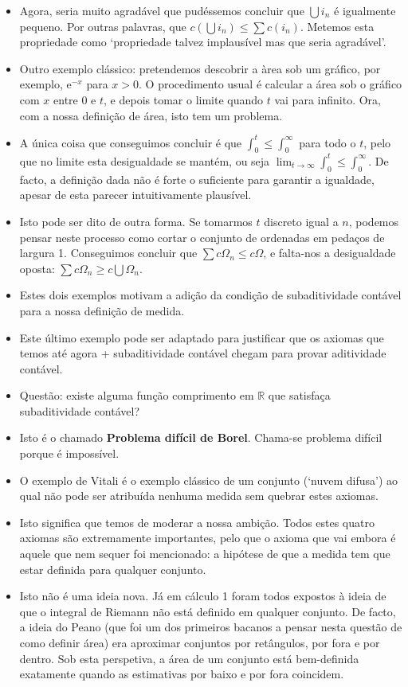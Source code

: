 \documentclass{article}
\newcommand{\R}{\mathbb{R}}
\newcommand{\e}{\mathrm{e}}
\begin{document}
\begin{itemize}
\item Agora, seria muito agradável que pudéssemos concluir que $\bigcup i_n$ é igualmente pequeno. Por outras palavras, que $c(\bigcup i_n) \leq \sum c(i_n)$. Metemos esta propriedade como `propriedade talvez implausível mas que seria agradável'.
\item Outro exemplo clássico: pretendemos descobrir a àrea sob um gráfico, por exemplo, $\e^{-x}$ para $x>0$. O procedimento usual é calcular a área sob o gráfico com $x$ entre $0$ e $t$, e depois tomar o limite quando $t$ vai para infinito. Ora, com a nossa definição de área, isto tem um problema.
\item A única coisa que conseguimos concluir é que $\int_0^t \leq \int_0^\infty$ para todo o $t$, pelo que no limite esta desigualdade se mantém, ou seja $\lim_{t \to \infty} \int_0^t \leq \int_0^\infty$. De facto, a definição dada não é forte o suficiente para garantir a igualdade, apesar de esta parecer intuitivamente plausível.
\item Isto pode ser dito de outra forma. Se tomarmos $t$ discreto igual a $n$, podemos pensar neste processo como cortar o conjunto de ordenadas em pedaços de largura 1. Conseguimos concluir que $\sum c \Omega_n \leq c \Omega$, e falta-nos a desigualdade oposta: $\sum c \Omega_n \geq c \bigcup \Omega_n$.
\item Estes dois exemplos motivam a adição da condição de subaditividade contável para a nossa definição de medida.
\item Este último exemplo pode ser adaptado para justificar que os axiomas que temos até agora + subaditividade contável chegam para provar aditividade contável.
\item Questão: existe alguma função comprimento em $\R$ que satisfaça subaditividade contável?
\item Isto é o chamado \textbf{Problema difícil de Borel}. Chama-se problema difícil porque é impossível.
\item O exemplo de Vitali é o exemplo clássico de um conjunto (`nuvem difusa') ao qual não pode ser atribuída nenhuma medida sem quebrar estes axiomas.
\item Isto significa que temos de moderar a nossa ambição. Todos estes quatro axiomas são extremamente importantes, pelo que o axioma que vai embora é aquele que nem sequer foi mencionado: a hipótese de que a medida tem que estar definida para qualquer conjunto.
\item Isto não é uma ideia nova. Já em cálculo 1 foram todos expostos à ideia de que o integral de Riemann não está definido em qualquer conjunto. De facto, a ideia do Peano (que foi um dos primeiros bacanos a pensar nesta questão de como definir área) era aproximar conjuntos por retângulos, por fora e por dentro. Sob esta perspetiva, a área de um conjunto está bem-definida exatamente quando as estimativas por baixo e por fora coincidem.

\end{itemize}
\end{document}
